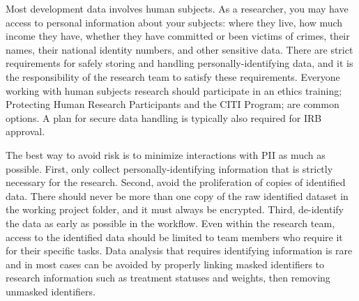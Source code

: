 Most development data involves human subjects.
As a researcher, you may have access to personal information about your subjects:
where they live, how much income they have, 
whether they have committed or been victims of crimes,
their names, their national identity numbers, and other sensitive data.
There are strict requirements for safely storing and handling personally-identifying data,
and it is the responsibility of the research team to satisfy these requirements.
Everyone working with human subjects research should participate in an ethics training;
Protecting Human Research Participants
and the CITI Program; 
are common options.
A plan for secure data handling is typically also required for IRB approval.

The best way to avoid risk is to minimize interactions with PII as much as possible.
First, only collect personally-identifying information that is strictly necessary for the research.
Second, avoid the proliferation of copies of identified data.
There should never be more than one copy of the raw identified dataset in the working project folder,
and it must always be encrypted.
Third, de-identify the data as early as possible in the workflow.
Even within the research team,
access to the identified data should be limited to team members who require it for their specific tasks.
Data analysis that requires identifying information is rare
and in most cases can be avoided by properly linking masked identifiers to research information
such as treatment statuses and weights, then removing unmasked identifiers.


